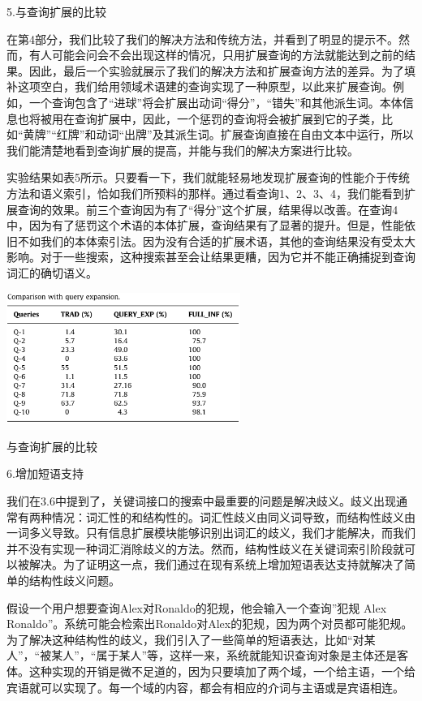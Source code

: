 5.与查询扩展的比较

在第4部分，我们比较了我们的解决方法和传统方法，并看到了明显的提示不。然而，有人可能会问会不会出现这样的情况，只用扩展查询的方法就能达到之前的结果。因此，最后一个实验就展示了我们的解决方法和扩展查询方法的差异。为了填补这项空白，我们给用领域术语建的查询实现了一种原型，以此来扩展查询。例如，一个查询包含了“进球”将会扩展出动词“得分”，“错失”和其他派生词。本体信息也将被用在查询扩展中，因此，一个惩罚的查询将会被扩展到它的子类，比如“黄牌”“红牌”和动词“出牌”及其派生词。扩展查询直接在自由文本中运行，所以我们能清楚地看到查询扩展的提高，并能与我们的解决方案进行比较。

实验结果如表5所示。只要看一下，我们就能轻易地发现扩展查询的性能介于传统方法和语义索引，恰如我们所预料的那样。通过看查询1、2、3、4，我们能看到扩展查询的效果。前三个查询因为有了“得分”这个扩展，结果得以改善。在查询4中，因为有了惩罚这个术语的本体扩展，查询结果有了显著的提升。但是，性能依旧不如我们的本体索引法。因为没有合适的扩展术语，其他的查询结果没有受太大影响。对于一些搜索，这种搜索甚至会让结果更糟，因为它并不能正确捕捉到查询词汇的确切语义。
	\begin{table}[htbp] 
	\centering\includegraphics[width=3in]{fig/trans/tab5.png} 
	\caption[]{与查询扩展的比较}
	\end{table} 

6.增加短语支持

我们在3.6中提到了，关键词接口的搜索中最重要的问题是解决歧义。歧义出现通常有两种情况：词汇性的和结构性的。词汇性歧义由同义词导致，而结构性歧义由一词多义导致。只有信息扩展模块能够识别出词汇的歧义，我们才能解决，而我们并不没有实现一种词汇消除歧义的方法。然而，结构性歧义在关键词索引阶段就可以被解决。为了证明这一点，我们通过在现有系统上增加短语表达支持就解决了简单的结构性歧义问题。

假设一个用户想要查询{\Times Alex}对{\Times Ronaldo}的犯规，他会输入一个查询”犯规 {\Times Alex Ronaldo}”。系统可能会检索出{\Times Ronaldo}对{\Times Alex}的犯规，因为两个对员都可能犯规。为了解决这种结构性的歧义，我们引入了一些简单的短语表达，比如“对某人”，“被某人”，“属于某人”等，这样一来，系统就能知识查询对象是主体还是客体。这种实现的开销是微不足道的，因为只要填加了两个域，一个给主语，一个给宾语就可以实现了。每一个域的内容，都会有相应的介词与主语或是宾语相连。

